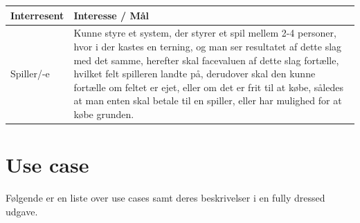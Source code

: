     \begin{tabular}{ | l | p{13cm} |}
      
      \hline
    \textbf{Interresent} & \textbf{Interesse / Mål} \\ \hline
    Spiller/-e & Kunne styre et system, der styrer et spil mellem 2-4 personer, 
    hvor i der kastes en terning, og man ser resultatet af dette slag med det samme, herefter skal facevaluen af dette slag fortælle, hvilket felt spilleren landte på, derudover skal den kunne fortælle om feltet er ejet, eller om det er frit til at købe, således at man enten skal betale til en spiller, eller har mulighed for at købe grunden.\\ \hline
      
    \hline
    \end{tabular}


\newpage

\section{Use case}

Følgende er en liste over use cases samt deres beskrivelser i en fully dressed udgave.


